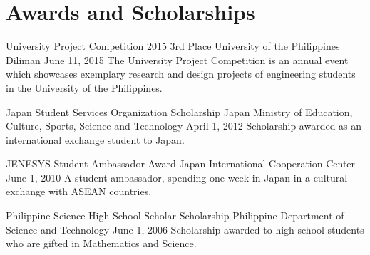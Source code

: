 \section*{Awards and Scholarships}

\award
  {University Project Competition 2015}
  {3rd Place}
  {University of the Philippines Diliman}
  {June 11, 2015}
  {The University Project Competition is an annual event which showcases exemplary research and design projects of engineering students in the University of the Philippines.}

\award
  {Japan Student Services Organization}
  {Scholarship}
  {Japan Ministry of Education, Culture, Sports, Science and Technology}
  {April 1, 2012}
  {Scholarship awarded as an international exchange student to Japan.}

\award
  {JENESYS Student Ambassador}
  {Award}
  {Japan International Cooperation Center}
  {June 1, 2010}
  {A student ambassador, spending one week in Japan in a cultural exchange with ASEAN countries.}

\award
  {Philippine Science High School Scholar}
  {Scholarship}
  {Philippine Department of Science and Technology}
  {June 1, 2006}
  {Scholarship awarded to high school students who are gifted in Mathematics and Science.}